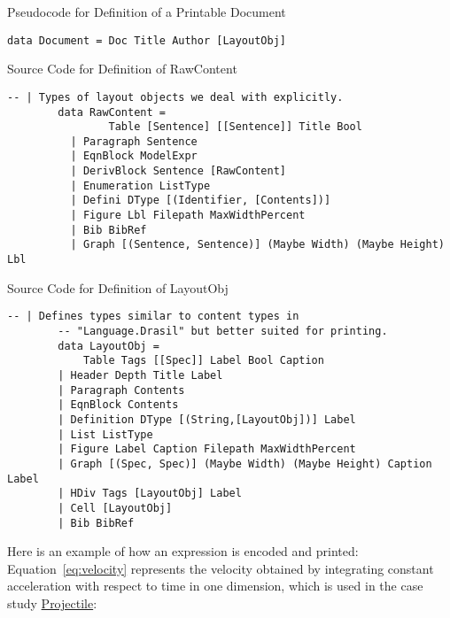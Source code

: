 \begin{listing}[h]
	\caption{Pseudocode for Definition of a Printable Document}
	\label{code:Document}
	\begin{lstlisting}[language=haskell1]
		data Document = Doc Title Author [LayoutObj]
	\end{lstlisting}
\end{listing}

\begin{listing}[h]
	\caption{Source Code for Definition of RawContent}
	\label{code:RawContent}
	\begin{lstlisting}[language=haskell1]
		-- | Types of layout objects we deal with explicitly.
		data RawContent =
				Table [Sentence] [[Sentence]] Title Bool
		  | Paragraph Sentence                       
		  | EqnBlock ModelExpr                      
		  | DerivBlock Sentence [RawContent]        
		  | Enumeration ListType                    
		  | Defini DType [(Identifier, [Contents])] 
		  | Figure Lbl Filepath MaxWidthPercent     
		  | Bib BibRef                              
		  | Graph [(Sentence, Sentence)] (Maybe Width) (Maybe Height) Lbl
	\end{lstlisting}
\end{listing}

\begin{listing}[h]
	\caption{Source Code for Definition of LayoutObj}
	\label{code:LayoutObj}
	\begin{lstlisting}[language=haskell1]
		-- | Defines types similar to content types in 
		-- "Language.Drasil" but better suited for printing.
		data LayoutObj = 
			Table Tags [[Spec]] Label Bool Caption                          
		| Header Depth Title Label                                       
		| Paragraph Contents                                              
		| EqnBlock Contents                                               
		| Definition DType [(String,[LayoutObj])] Label                   
		| List ListType                                                   
		| Figure Label Caption Filepath MaxWidthPercent                  
		| Graph [(Spec, Spec)] (Maybe Width) (Maybe Height) Caption Label 
		| HDiv Tags [LayoutObj] Label                                    
		| Cell [LayoutObj] 
		| Bib BibRef         
	\end{lstlisting}
\end{listing}

Here is an example of how an expression is encoded and printed: 
Equation~\ref{eq:velocity} represents the velocity obtained by integrating 
constant acceleration with respect to time in one dimension, which is used in 
the case study 
\href{https://jacquescarette.github.io/Drasil/examples/projectile/SRS/srs/Projectile_SRS.html}{Projectile}:
 

